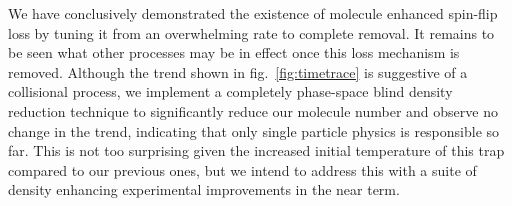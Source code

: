 \documentclass[%
 reprint,
 amsmath,amssymb,
 aps,
prl,
]{revtex4-1}
\begin{document}
We have conclusively demonstrated the existence of molecule enhanced spin-flip loss by tuning it from an overwhelming rate to complete removal. It remains to be seen what other processes may be in effect once this loss mechanism is removed. Although the trend shown in fig.~\ref{fig:timetrace} is suggestive of a collisional process, we implement a completely phase-space blind density reduction technique to significantly reduce our molecule number and observe no change in the trend, indicating that only single particle physics is responsible so far. This is not too surprising given the increased initial temperature of this trap compared to our previous ones, but we intend to address this with a suite of density enhancing experimental improvements in the near term.

\nocite{*}


\end{document}
